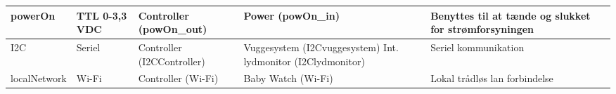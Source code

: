 \begin{center}
\begin{longtable}{|p{}|p{}|p{}|p{}|p{3cm}|}
powerOn			
&TTL 0-3,3 VDC				
&Controller \newline (powOn\_out) 			
&Power \newline (powOn\_in)	
&Benyttes til at tænde og slukket for strømforsyningen   		\\\hline

I2C			
&Seriel				
&Controller \newline (I2CController) 			
&Vuggesystem \newline (I2Cvuggesystem) \newline
 Int. lydmonitor \newline (I2Clydmonitor)	
&Seriel kommunikation
\\\hline

localNetwork			
&Wi-Fi				
&Controller \newline (Wi-Fi) 			
&Baby Watch \newline (Wi-Fi)	
&Lokal trådløs lan forbindelse   				\\\hline

\end{longtable}
\end{center}
